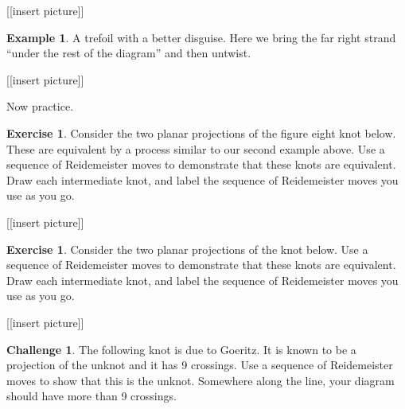 \documentclass[12pt,letterpaper]{article}
\theoremstyle{definition}
\newtheorem{example}{Example}
\newtheorem{exercise}[question]{Exercise}
\newtheorem*{challenge}{Challenge}
\begin{document}
[[insert picture]]

\begin{example}
A trefoil with a better disguise.
Here we bring the far right strand ``under the rest of the diagram'' and then untwist.
\end{example}

[[insert picture]]


Now practice.

\begin{exercise} Consider the two planar projections of the figure eight knot below. 
These are equivalent by a process similar to our second example above.
Use a sequence of Reidemeister moves to demonstrate that these knots are equivalent. 
Draw each intermediate knot, and label the sequence of Reidemeister moves you use as you go.
\end{exercise}

[[insert picture]]


\begin{exercise} Consider the two planar projections of the knot below. 
Use a sequence of Reidemeister moves to demonstrate that these knots are equivalent. 
Draw each intermediate knot, and label the sequence of Reidemeister moves you use as you go.
\end{exercise}

[[insert picture]]


\begin{challenge}
The following knot is due to Goeritz. It is known to be a projection of the unknot and it has 9 crossings. 
Use a sequence of Reidemeister moves to show that this is the unknot.
Somewhere along the line, your diagram should have more than 9 crossings.
\end{challenge}





\end{document}
